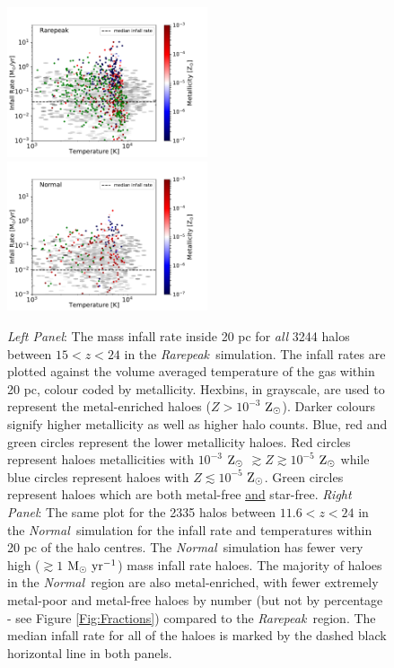\documentclass[twocolumn,iop,revtex4]{openjournal}
\newcommand{\msolaryrc} {$\rm{M_{\odot}~yr^{-1}}$}
\newcommand{\zsolar} {$\rm{Z_{\odot}}~$}
\newcommand{\zsolarc} {$\rm{Z_{\odot}}$}
\newcommand{\rarepeak} {\textit{Rarepeak~}}
\newcommand{\normal} {\textit{Normal~}}
\begin{document}
\begin{figure}
\centering
\begin{minipage}{175mm}      \begin{center} 
\centerline{
\includegraphics[width=0.525\textwidth]{FIGURES/Rarepeak_MdotTZ.pdf}
\includegraphics[width=0.525\textwidth]{FIGURES/Normal_MdotTZ.pdf}}
\caption{\textit{Left Panel}: The mass infall rate inside 20 pc for \textit{all} 
  3244 halos between $15<z<24$ in 
  the \rarepeak simulation. The infall rates are plotted
  against the volume averaged temperature of the gas within 20 pc, colour coded by metallicity. Hexbins, in
  grayscale, are used to represent the metal-enriched haloes ($Z > 10^{-3}$ \zsolarc).
  Darker colours signify higher metallicity as well as higher halo counts. Blue, red and green circles
  represent the lower metallicity haloes. Red circles represent haloes metallicities
  with $10^{-3} $ \zsolar $\gtrsim Z \gtrsim 10^{-5}$ \zsolar while blue circles represent
  haloes with $Z \lesssim 10^{-5}$ \zsolarc. Green circles represent haloes which are both
  metal-free \underline{and} star-free.  \textit{Right Panel}: The same plot for the 2335 halos between $11.6<z<24$ in the \normal simulation
  for the infall rate and temperatures within 20 pc of the halo centres.
  The \normal simulation has fewer very high ($ \gtrsim 1 $ \msolaryrc) mass infall rate haloes.
  The majority of haloes in the \normal region are also metal-enriched, with fewer extremely metal-poor and
  metal-free haloes by number (but not by percentage - see Figure \ref{Fig:Fractions}) compared to the \rarepeak region.
  The median infall rate for all of the haloes is marked by the dashed 
  black horizontal line in both panels.}
  \label{Fig:Scatter}
\end{center} \end{minipage}

\end{figure}
\end{document}
